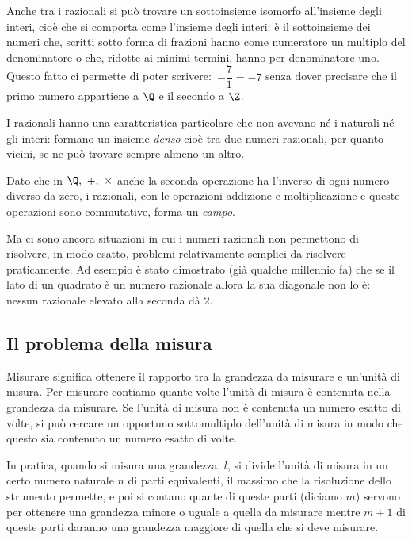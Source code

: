Anche tra i razionali si può trovare un sottoinsieme isomorfo all'insieme 
degli interi, cioè che si comporta come l'insieme degli interi: è il 
sottoinsieme dei numeri che, scritti sotto forma di frazioni hanno come 
numeratore un multiplo del denominatore o che, ridotte ai minimi termini, 
hanno per denominatore uno. 
Questo fatto ci permette di poter scrivere:~\(-\dfrac{7}{1} = -7\) 
senza dover precisare che il primo numero appartiene a \(\Q\) e il secondo 
a \(\Z\).

I razionali hanno una caratteristica particolare che non avevano né i 
naturali né gli interi: formano un insieme \emph{denso} cioè tra due numeri 
razionali, per quanto vicini, se ne può trovare sempre almeno un altro.

Dato che in \(\Q,~+,~\times\) anche la seconda operazione ha l'inverso di 
ogni numero diverso da zero, i razionali, con le operazioni addizione e 
moltiplicazione e queste operazioni sono commutative, forma un \emph{campo}.

Ma ci sono ancora situazioni in cui i numeri razionali non permettono di 
risolvere, in modo esatto, problemi relativamente semplici da risolvere 
praticamente. 
Ad esempio è stato dimostrato (già qualche millennio fa) che se il lato di 
un quadrato è un numero razionale allora la sua diagonale non lo è:
nessun razionale elevato alla seconda dà \(2\).

\subsection{Il problema della misura}

Misurare significa ottenere il rapporto tra la grandezza da misurare e 
un'unità di misura.
Per misurare contiamo quante volte l'unità di misura è contenuta nella 
grandezza da misurare.
Se l'unità di misura non è contenuta un numero esatto di volte, si può 
cercare un opportuno sottomultiplo dell'unità di misura in modo che questo 
sia contenuto un numero esatto di volte. 

In pratica, quando si misura una grandezza, \(l\), si divide l'unità di 
misura in un certo numero naturale \(n\) di parti equivalenti, il massimo che 
la risoluzione dello strumento permette,
e poi si contano quante di queste parti (diciamo \(m\)) servono per ottenere 
una grandezza minore o uguale a quella da misurare mentre \(m+1\) di queste 
parti daranno una grandezza maggiore di quella che si deve misurare.


